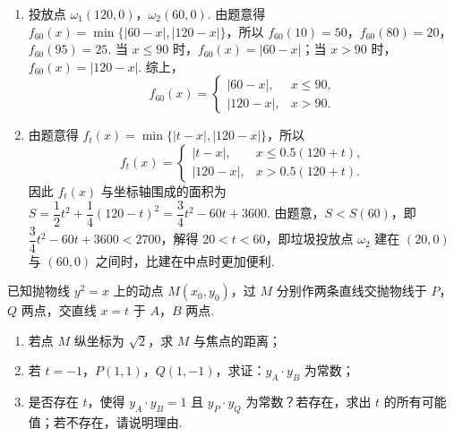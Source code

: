 \begin{solution}
\begin{enumerate}
\item 投放点 \(\omega_1(120,0)\)，\(\omega_2(60,0)\). 由题意得 \(f_{60}(x)=\min\{|60-x|,|120-x|\}\)，所以 \(f_{60}(10)=50\)，\(f_{60}(80)=20\)，\(f_{60}(95)=25\). 当 \(x\leq90\) 时，\(f_{60}(x)=|60-x|\)；当 \(x>90\) 时，\(f_{60}(x)=|120-x|\). 综上，
\[
f_{60}(x)=
\begin{cases}
|60-x|,&x\leq90,\\
|120-x|,&x>90.
\end{cases}
\]
\item 由题意得 \(f_t(x)=\min\{|t-x|,|120-x|\}\)，所以
\[
f_t(x)=
\begin{cases}
|t-x|,&x\leq0.5(120+t),\\
|120-x|,&x>0.5(120+t).
\end{cases}
\]
因此 \(f_t(x)\) 与坐标轴围成的面积为 \(S=\dfrac{1}{2}t^2+\dfrac{1}{4}(120-t)^2=\dfrac{3}{4}t^2-60t+3600\). 由题意，\(S<S(60)\)，即 \(\dfrac{3}{4}t^2-60t+3600<2700\)，解得 \(20<t<60\)，即垃圾投放点 \(\omega_2\) 建在 \((20,0)\) 与 \((60,0)\) 之间时，比建在中点时更加便利.
\end{enumerate}
\end{solution}

\begin{problem}
已知抛物线 \(y^2=x\) 上的动点 \(M(x_0,y_0)\)，过 \(M\) 分别作两条直线交抛物线于 \(P\)，\(Q\) 两点，交直线 \(x=t\) 于 \(A\)，\(B\) 两点.
\begin{enumerate}
\item 若点 \(M\) 纵坐标为 \(\sqrt{2}\)，求 \(M\) 与焦点的距离；
\item 若 \(t=-1\)，\(P(1,1)\)，\(Q(1,-1)\)，求证：\(y_A\cdot y_B\) 为常数；
\item 是否存在 \(t\)，使得 \(y_A\cdot y_B=1\) 且 \(y_P\cdot y_Q\) 为常数？若存在，求出 \(t\) 的所有可能值；若不存在，请说明理由.
\end{enumerate}
\end{problem}

